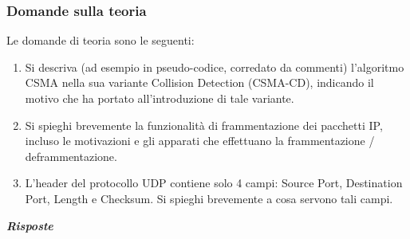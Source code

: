 \documentclass[a4paper]{article}
\begin{document}
	\subsubsection{Domande sulla teoria}
	Le domande di teoria sono le seguenti:
	\begin{enumerate}
		\item Si descriva (ad esempio in pseudo-codice, corredato da commenti) l'algoritmo CSMA nella sua variante Collision Detection (CSMA-CD), indicando il motivo che ha portato all'introduzione di tale variante.
		
		\item Si spieghi brevemente la funzionalità di frammentazione dei pacchetti IP, incluso le motivazioni e gli apparati che effettuano la frammentazione / deframmentazione.
		
		\item L'header del protocollo UDP contiene solo 4 campi: Source Port, Destination Port, Length e Checksum. Si spieghi brevemente a cosa servono tali campi.
	\end{enumerate}
	\textcolor{Green4}{\textbf{\emph{Risposte}}}
\end{document}
